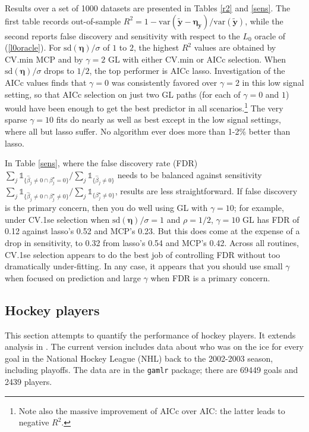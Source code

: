 \documentclass[12pt]{article}
\newcommand{\bs}[1]{\boldsymbol{#1}}
\newcommand{\mr}[1]{\mathrm{#1}}
\newcommand{\bm}[1]{\mathbf{#1}}
\newcommand{\ds}[1]{\mathds{#1}}
\begin{document}
Results over a set of 1000 datasets are presented in Tables \ref{r2} and
\ref{sens}.  The first table records out-of-sample $R^2 = 1 -
\mr{var}(\bm{\tilde y} - \bs{\eta}_\bm{y})/\mr{var}(\bm{\tilde y})$, while the
second reports false discovery and sensitivity with respect to the $L_0$
oracle of (\ref{l0oracle}).  For $\mr{sd}(\bm{\eta})/\sigma$ of $1$ to $2$,
the highest $R^2$ values are obtained by CV.min  MCP and  by $\gamma=2$  GL
with either CV.min or AICc selection. When $\mr{sd}(\bm{\eta})/\sigma$ drops
to $1/2$, the top performer is AICc lasso. Investigation of the AICc values
finds that $\gamma=0$ was consistently favored over $\gamma=2$ in this low
signal setting, so that AICc selection on just two GL paths (for each of
$\gamma=0$ and $1$) would have been enough to get the best predictor in all
scenarios.\footnote{Note also the massive improvement of AICc over AIC: the
latter leads to negative $R^2$.} The very sparse $\gamma=10$ fits do nearly as
well as best except in the low signal settings, where all but lasso suffer.
No algorithm ever does more than 1-2\% better
than lasso.  

In Table \ref{sens}, where the false
discovery rate (FDR) $\sum_j\ds{1}_{\{\hat\beta_j \neq 0 \cap
\beta^\star_j=0\}}/\sum_j\ds{1}_{\{\hat\beta_j \neq 0\}}$ needs to be balanced
against sensitivity $\sum_j\ds{1}_{\{\hat\beta_j \neq 0 \cap \beta^\star_j
\neq 0\}}/\sum_j\ds{1}_{\{\beta^\star_j \neq 0\}}$, results are less
straightforward.  If false discovery is the primary concern, then you do well
using GL with $\gamma=10$; for example, under CV.1se selection when
$\mr{sd}(\bm{\eta})/\sigma=1$ and $\rho=1/2$, $\gamma=10$ GL has FDR of 0.12
against lasso's 0.52 and MCP's 0.23.  But this does come at the expense of a
drop in sensitivity, to 0.32 from lasso's 0.54 and MCP's 0.42. Across all
routines,  CV.1se selection  appears to do the best job of controlling
FDR without too dramatically under-fitting.  In any case, it appears that you
should use small $\gamma$ when focused on prediction and large $\gamma$ when
FDR is a primary concern.


\subsection{Hockey players}


This section attempts to quantify the
performance of hockey players.  It extends  analysis in
\cite{gramacy_estimating_2013}.  The current version includes data about who
was on the ice for every goal in the National Hockey League (NHL) back to the
2002-2003 season, including playoffs.  The data
are in the {\tt gamlr} package; there are
69449 goals and 2439 players.
\end{document}
